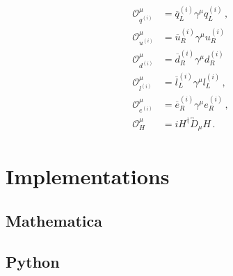 \documentclass[notitlepage,12pt]{article}
\begin{document}
\begin{align}
\begin{split}
\mathcal{O}_{q^{(i)}}^\mu &= \overline{q}^{(i)}_L \gamma^\mu q^{(i)}_L \,,\\
\mathcal{O}_{u^{(i)}}^\mu &= \overline{u}^{(i)}_R \gamma^\mu u^{(i)}_R\, \\
\mathcal{O}_{d^{(i)}}^\mu &= \overline{d}^{(i)}_R \gamma^\mu d^{(i)}_R\, \\
\mathcal{O}_{l^{(i)}}^\mu &= \overline{l}^{(i)}_L \gamma^\mu l^{(i)}_L \,,\\
\mathcal{O}_{e^{(i)}}^\mu &= \overline{e}^{(i)}_R \gamma^\mu e^{(i)}_R \,,\\
\mathcal{O}_H^\mu &= i H^\dagger \overleftrightarrow{D}_\mu H\,.
\end{split}
\end{align}

\section{Implementations}
\label{sec:implementations}

\subsection{Mathematica}

\subsection{Python}
\end{document}
